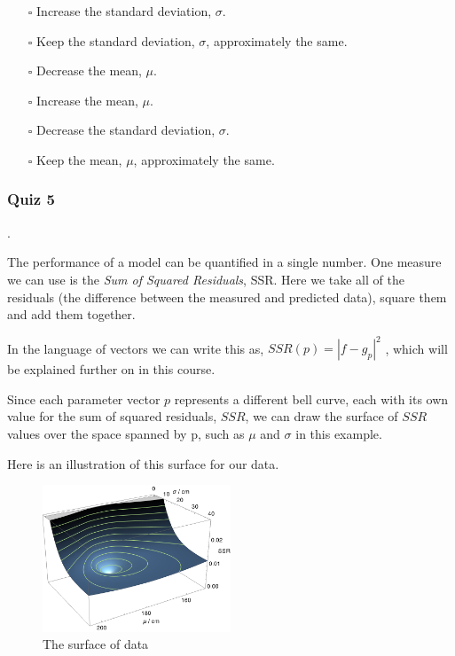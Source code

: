 \documentclass[]{article}
\begin{document}
\begin{itemize}
	\item[$\square$] Increase the standard deviation, $ \sigma $.
	\item[$\square$] Keep the standard deviation, $ \sigma $, approximately the same.
	\item[$\square$] Decrease the mean, $ \mu $.
	\item[$\square$] Increase the mean, $ \mu $.
	\item[$\square$] Decrease the standard deviation, $ \sigma $.
	\item[$\square$] Keep the mean, $ \mu $, approximately the same.
\end{itemize}

\subsubsection{Quiz 5}.

The performance of a model can be quantified in a single number. One measure we can use is the \textit{Sum of Squared Residuals}, SSR. Here we take all of the residuals (the difference between the measured and predicted data), square them and add them together.

In the language of vectors we can write this as, $ SSR(p)=|f-g_p|^2 $ , which will be explained further on in this course.

Since each parameter vector $ p $ represents a different bell curve, each with its own value for the sum of squared residuals, $ SSR $, we can draw the surface of $ SSR $ values over the space spanned by p, such as $ \mu $ and $ \sigma $ in this example.

Here is an illustration of this surface for our data.

\begin{figure}[h]
	\centering
	\includegraphics[width=0.5\textwidth]{quiz5_a}
	\caption{The surface of data}
	\label{fig:quiz5_a}
\end{figure}
\end{document}
